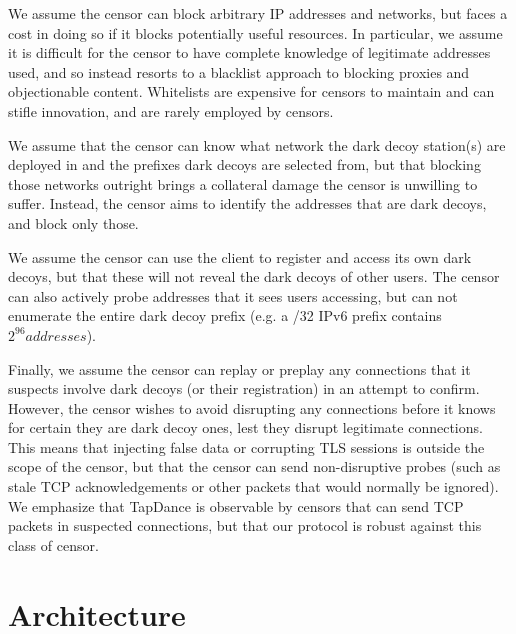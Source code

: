 \documentclass[letterpaper,twocolumn,10pt]{article}
\begin{document}
We assume the censor can block arbitrary IP addresses and networks, but faces a
cost in doing so if it blocks potentially useful resources. In particular, we
assume it is difficult for the censor to have complete knowledge of legitimate
addresses used, and so instead resorts to a blacklist approach to blocking
proxies and objectionable content.
Whitelists are expensive for censors to maintain and can stifle
innovation, and are rarely employed by censors.


We assume that the censor can know what network the dark decoy station(s) are
deployed in and the prefixes dark decoys are selected from, but that blocking those
networks outright brings a collateral
damage the censor is unwilling to suffer. Instead, the censor aims to identify
the addresses that are dark decoys, and block only those.

We assume the censor can use the client to register and access its own dark
decoys, but that these will not reveal the dark decoys of other users. The
censor can also actively probe addresses that it sees users accessing, but can
not enumerate the entire dark decoy prefix (e.g. a /32 IPv6 prefix contains
$2^{96} addresses$).

Finally, we assume the censor can replay or preplay any connections that it
suspects involve dark decoys (or their registration) in an attempt to confirm.
However, the censor wishes to avoid disrupting any connections before it
knows for certain they are dark decoy ones, lest they disrupt legitimate
connections. This means that injecting false data or corrupting TLS sessions is
outside the scope of the censor, but that the censor can send non-disruptive
probes (such as stale TCP acknowledgements or other packets that would normally
be ignored). We emphasize that TapDance is observable by censors that can send
TCP packets in suspected connections, but that our protocol is robust against
this class of censor.



\section{Architecture}
\end{document}
